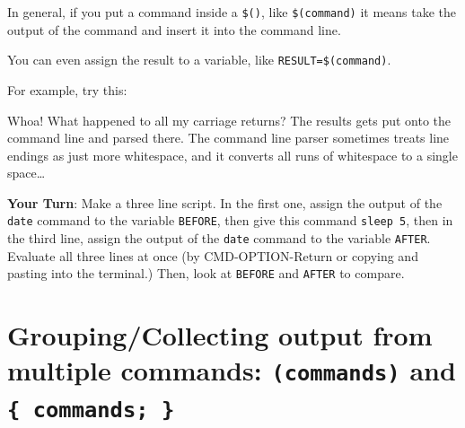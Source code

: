 \documentclass[]{krantz}
\makeatletter
\newenvironment{Shaded}{\begin{snugshade}}{\end{snugshade}}
\newcommand{\BuiltInTok}[1]{#1}
\newcommand{\CommentTok}[1]{\textcolor[rgb]{0.37,0.37,0.37}{\textit{#1}}}
\newcommand{\FunctionTok}[1]{\textcolor[rgb]{0,0,0}{#1}}
\newcommand{\NormalTok}[1]{#1}
\newcommand{\StringTok}[1]{\textcolor[rgb]{0.5,0.5,0.5}{#1}}
\newcommand{\VariableTok}[1]{\textcolor[rgb]{0,0,0}{#1}}
\newenvironment{kframe}{%
\medskip{}
\setlength{\fboxsep}{.8em}
 \def\at@end@of@kframe{}%
 \ifinner\ifhmode%
  \def\at@end@of@kframe{\end{minipage}}%
  \begin{minipage}{\columnwidth}%
 \fi\fi%
 \def\FrameCommand##1{\hskip\@totalleftmargin \hskip-\fboxsep
 \colorbox{shadecolor}{##1}\hskip-\fboxsep
     \hskip-\linewidth \hskip-\@totalleftmargin \hskip\columnwidth}%
 \MakeFramed {\advance\hsize-\width
   \@totalleftmargin\z@ \linewidth\hsize
   \@setminipage}}%
 {\par\unskip\endMakeFramed%
 \at@end@of@kframe}
\renewenvironment{Shaded}{\begin{kframe}}{\end{kframe}}
\makeatother
\begin{document}
\begin{Shaded}
\end{Shaded}

In general, if you put a command inside a \texttt{\$()}, like \texttt{\$(command)} it means take the output of
the command and insert it into the command line.

You can even assign the result to a variable, like \texttt{RESULT=\$(command)}.

For example, try this:

\begin{Shaded}
\end{Shaded}

Whoa! What happened to all my carriage returns? The results gets put onto the command line and
parsed there. The command line parser sometimes treats line endings as just more whitespace,
and it converts all runs of whitespace to a single space\ldots{}

\textbf{Your Turn}: Make a three line script. In the first one, assign the output
of the \texttt{date} command to the variable \texttt{BEFORE}, then give this command \texttt{sleep\ 5},
then in the third line, assign the output of the \texttt{date} command to the variable
\texttt{AFTER}. Evaluate all three lines at once (by CMD-OPTION-Return or copying and pasting
into the terminal.) Then, look at \texttt{BEFORE} and \texttt{AFTER} to compare.

\hypertarget{groupingcollecting-output-from-multiple-commands-commands-and-commands}{%
\section{\texorpdfstring{Grouping/Collecting output from multiple commands: \texttt{(commands)} and \texttt{\{\ commands;\ \}}}{Grouping/Collecting output from multiple commands: (commands) and \{ commands; \}}}\label{groupingcollecting-output-from-multiple-commands-commands-and-commands}}
\end{document}
